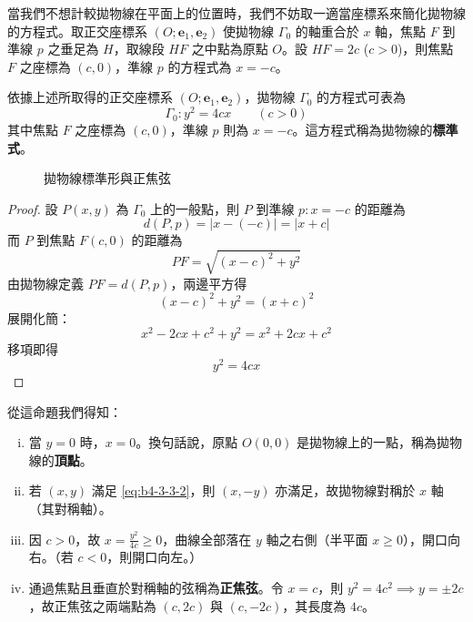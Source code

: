當我們不想計較拋物線在平面上的位置時，我們不妨取一適當座標系來簡化拋物線的方程式。取正交座標系 $(O; \mathbf{e}_1, \mathbf{e}_2)$ 使拋物線 $\Gamma_0$ 的軸重合於 $x$ 軸，焦點 $F$ 到準線 $p$ 之垂足為 $H$，取線段 $HF$ 之中點為原點 $O$。設 $HF = 2c$ ($c > 0$)，則焦點 $F$ 之座標為 $(c,0)$，準線 $p$ 的方程式為 $x = -c$。

\begin{proposition}
依據上述所取得的正交座標系 $(O; \mathbf{e}_1, \mathbf{e}_2)$，拋物線 $\Gamma_0$ 的方程式可表為
\begin{equation}
\Gamma_0 : y^2 = 4cx \qquad (c > 0) \label{eq:b4-3-3-2}
\end{equation}
其中焦點 $F$ 之座標為 $(c,0)$，準線 $p$ 則為 $x = -c$。這方程式稱為拋物線的\textbf{標準式}。
\end{proposition}

\begin{figure}[htbp]
\centering
{}
\caption{拋物線標準形與正焦弦}
\label{fig:b4-3-19}
\end{figure}

\begin{proof}
設 $P(x,y)$ 為 $\Gamma_0$ 上的一般點，則 $P$ 到準線 $p: x = -c$ 的距離為
\[ d(P, p) = |x - (-c)| = |x + c| \]
而 $P$ 到焦點 $F(c,0)$ 的距離為
\[ PF = \sqrt{(x-c)^2 + y^2} \]
由拋物線定義 $PF = d(P, p)$，兩邊平方得
\[ (x-c)^2 + y^2 = (x+c)^2 \]
展開化簡：
\[ x^2 - 2cx + c^2 + y^2 = x^2 + 2cx + c^2 \]
移項即得
\[ y^2 = 4cx \]
\end{proof}

從這命題我們得知：
\begin{enumerate}[(i)]
  \item 當 $y=0$ 時，$x=0$。換句話說，原點 $O(0,0)$ 是拋物線上的一點，稱為拋物線的\textbf{頂點}。
  \item 若 $(x,y)$ 滿足 \eqref{eq:b4-3-3-2}，則 $(x,-y)$ 亦滿足，故拋物線對稱於 $x$ 軸（其對稱軸）。
  \item 因 $c > 0$，故 $x = \frac{y^2}{4c} \ge 0$，曲線全部落在 $y$ 軸之右側（半平面 $x \ge 0$），開口向右。（若 $c < 0$，則開口向左。）
  \item 通過焦點且垂直於對稱軸的弦稱為\textbf{正焦弦}。令 $x=c$，則 $y^2 = 4c^2 \implies y = \pm 2c$，故正焦弦之兩端點為 $(c, 2c)$ 與 $(c, -2c)$，其長度為 $4c$。
\end{enumerate}

